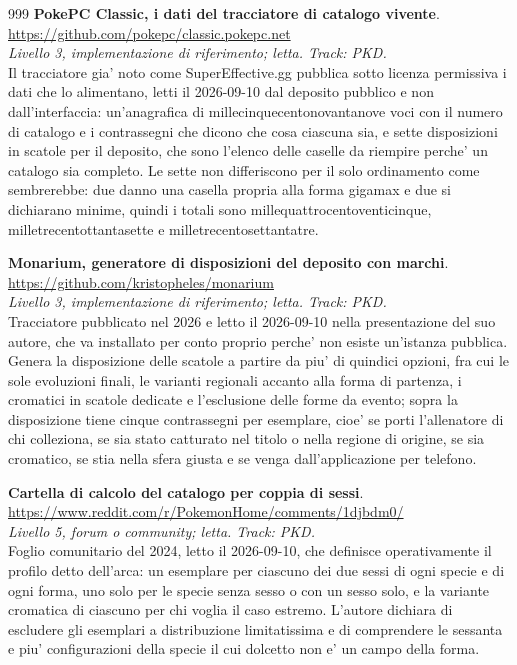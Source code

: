 \begin{thebibliography}{999}
  \textbf{PokePC Classic, i dati del tracciatore di catalogo vivente}.
  \\ \url{https://github.com/pokepc/classic.pokepc.net}
  \\ \emph{Livello 3, implementazione di riferimento; letta. Track: PKD.}
  \\ Il tracciatore gia' noto come SuperEffective.gg pubblica sotto licenza permissiva i dati che lo alimentano, letti il 2026-09-10 dal deposito pubblico e non dall'interfaccia: un'anagrafica di millecinquecentonovantanove voci con il numero di catalogo e i contrassegni che dicono che cosa ciascuna sia, e sette disposizioni in scatole per il deposito, che sono l'elenco delle caselle da riempire perche' un catalogo sia completo. Le sette non differiscono per il solo ordinamento come sembrerebbe: due danno una casella propria alla forma gigamax e due si dichiarano minime, quindi i totali sono millequattrocentoventicinque, milletrecentottantasette e milletrecentosettantatre.

  \textbf{Monarium, generatore di disposizioni del deposito con marchi}.
  \\ \url{https://github.com/kristopheles/monarium}
  \\ \emph{Livello 3, implementazione di riferimento; letta. Track: PKD.}
  \\ Tracciatore pubblicato nel 2026 e letto il 2026-09-10 nella presentazione del suo autore, che va installato per conto proprio perche' non esiste un'istanza pubblica. Genera la disposizione delle scatole a partire da piu' di quindici opzioni, fra cui le sole evoluzioni finali, le varianti regionali accanto alla forma di partenza, i cromatici in scatole dedicate e l'esclusione delle forme da evento; sopra la disposizione tiene cinque contrassegni per esemplare, cioe' se porti l'allenatore di chi colleziona, se sia stato catturato nel titolo o nella regione di origine, se sia cromatico, se stia nella sfera giusta e se venga dall'applicazione per telefono.

  \textbf{Cartella di calcolo del catalogo per coppia di sessi}.
  \\ \url{https://www.reddit.com/r/PokemonHome/comments/1djbdm0/}
  \\ \emph{Livello 5, forum o community; letta. Track: PKD.}
  \\ Foglio comunitario del 2024, letto il 2026-09-10, che definisce operativamente il profilo detto dell'arca: un esemplare per ciascuno dei due sessi di ogni specie e di ogni forma, uno solo per le specie senza sesso o con un sesso solo, e la variante cromatica di ciascuno per chi voglia il caso estremo. L'autore dichiara di escludere gli esemplari a distribuzione limitatissima e di comprendere le sessanta e piu' configurazioni della specie il cui dolcetto non e' un campo della forma.


\end{thebibliography}
